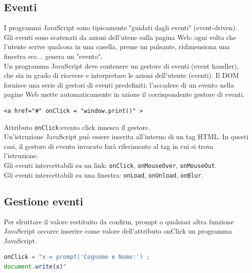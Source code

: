 \documentclass{article}
\begin{document}
\subsection{Eventi}
I programmi JavaScript sono tipicamente "guidati dagli eventi" (event-driven). Gli eventi sono scatenati da azioni dell'utene sulla pagina Web: ogni volta che l'utente scrive qualcosa in una casella, preme un pulsante, ridimensiona una finestra ecc... genera un "evento".
\\ Un programma JavaScript deve contenere un gestore di eventi (event handler), che sia in grado di ricevere e interpretare le azioni dell'utente (eventi). Il DOM fornisce una serie di gestori di eventi predefiniti: l'accadere di un evento nella pagine Web mette automaticamente in azione il corrispondente gestore di eventi.
\begin{lstlisting}[style=htmlstyle]
<a href="#" onClick = "window.print()" >
\end{lstlisting}
Attributo \texttt{onClick}:evento click innesca il gestore.
\\ Un'istruzione JavaScript può essere inserita all'interno di un tag HTML. In questi casi, il gestore di evento invocato farà riferimento al tag in cui si trova l'istruzione.
\\ Gli eventi intercettabili su un link: \texttt{onClick}, \texttt{onMouseOver}, \texttt{onMouseOut}.
\\ Gli eventi intercettabili su una finestra: \texttt{onLoad}, \texttt{onUnload}, \texttt{onBlur}.
\subsection{Gestione eventi}
Per sfruttare il valore restituito da confirm, prompt o qualsiasi altra funzione JavaScript occorre inserire come valore dell'attributo onClick un programma JavaScript.
\begin{lstlisting}[language=JavaScript]
onClick = "x = prompt('Cognome e Nome:') ;
document.write(x)"
\end{lstlisting}
\end{document}
